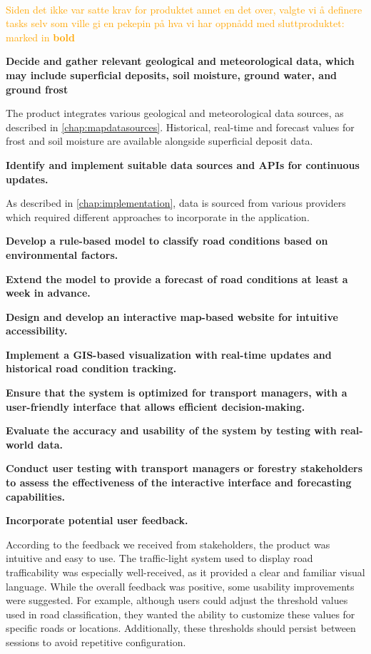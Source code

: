 \\ \textcolor{orange}{Siden det ikke var satte krav for produktet annet en det over, valgte vi å definere tasks selv som ville gi en pekepin på hva vi har oppnådd med sluttproduktet: marked in \textbf{bold}}


\textbf{Decide and gather relevant geological and meteorological data, which may include superficial deposits, soil moisture, ground water, and ground frost} 

The product integrates various geological and meteorological data sources, as described in \autoref{chap:mapdatasources}. Historical, real-time and forecast values for frost and soil moisture are available alongside superficial deposit data.

\textbf{Identify and implement suitable data sources and APIs for continuous updates.} 

As described in \autoref{chap:implementation}, data is sourced from various providers which required different approaches to incorporate in the application.

\textbf{Develop a rule-based model to classify road conditions based on environmental factors.}

\textbf{Extend the model to provide a forecast of road conditions at least a week in advance.}

\textbf{Design and develop an interactive map-based website for intuitive accessibility.}

\textbf{Implement a GIS-based visualization with real-time updates and historical road condition tracking.}

\textbf{Ensure that the system is optimized for transport managers, with a user-friendly interface that allows efficient decision-making.}

\textbf{Evaluate the accuracy and usability of the system by testing with real-world data.}

\textbf{Conduct user testing with transport managers or forestry stakeholders to assess the effectiveness of the interactive interface and forecasting capabilities.}

\textbf{Incorporate potential user feedback.}


According to the feedback we received from stakeholders, the product was intuitive and easy to use. The traffic-light system used to display road trafficability was especially well-received, as it provided a clear and familiar visual language. While the overall feedback was positive, some usability improvements were suggested. For example, although users could adjust the threshold values used in road classification, they wanted the ability to customize these values for specific roads or locations. Additionally, these thresholds should persist between sessions to avoid repetitive configuration.

